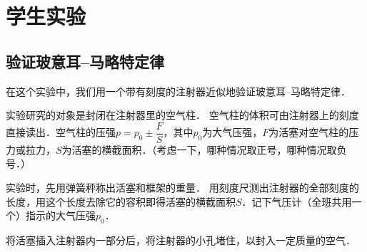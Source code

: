 \chapter{学生实验}

\section{验证玻意耳--马略特定律}\label{sec_B_app_01-1}

在这个实验中，我们用一个带有刻度的注射器近似地验证玻意耳--马略特定律．

实验研究的对象是封闭在注射器里的空气柱．
空气柱的体积可由注射器上的刻度直接读出．空气柱的压强$p=p_0\pm \dfrac{F}{S}$，其中$p_0$为大气压强，$F$为活塞对空气柱的压力或拉力，$S$为活塞的横截面积．（考虑一下，哪种情况取正号，哪种情况取负号．）

实验时，先用弹簧秤称出活塞和框架的重量．
用刻度尺测出注射器的全部刻度的长度，用这个长度去除它的容积即得活塞的横截面积$S$．记下气压计（全班共用一个）指示的大气压强$p_0$．

将活塞插入注射器内一部分后，将注射器的小孔堵住，以封入一定质量的空气．

